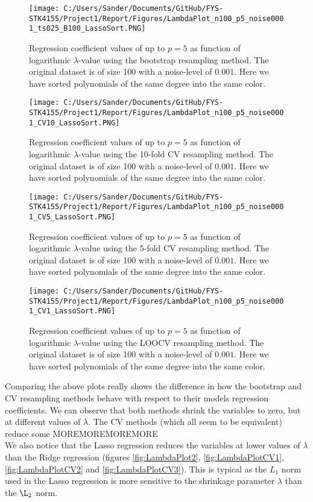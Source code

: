 \documentclass[12pt,a4paper]{article}
\begin{document}
\begin{figure}[H]
\centering
\texttt{[image: C:/Users/Sander/Documents/GitHub/FYS-STK4155/Project1/Report/Figures/LambdaPlot\_n100\_p5\_noise0001\_ts025\_B100\_LassoSort.PNG]}
\caption{\label{fig:LambdaLasso1} Regression coefficient values of up to $p = 5$ as function of logarithmic $\lambda$-value using the bootstrap resampling method. The original dataset is of size 100 with a noise-level of $0.001$. Here we have sorted polynomials of the same degree into the same color.}
\end{figure}

\begin{figure}[H]
\centering
\texttt{[image: C:/Users/Sander/Documents/GitHub/FYS-STK4155/Project1/Report/Figures/LambdaPlot\_n100\_p5\_noise0001\_CV10\_LassoSort.PNG]}
\caption{\label{fig:LambdaLasso2} Regression coefficient values of up to $p = 5$ as function of logarithmic $\lambda$-value using the 10-fold CV resampling method. The original dataset is of size 100 with a noise-level of $0.001$. Here we have sorted polynomials of the same degree into the same color.}
\end{figure}

\begin{figure}[H]
\centering
\texttt{[image: C:/Users/Sander/Documents/GitHub/FYS-STK4155/Project1/Report/Figures/LambdaPlot\_n100\_p5\_noise0001\_CV5\_LassoSort.PNG]}
\caption{\label{fig:LambdaLasso3} Regression coefficient values of up to $p = 5$ as function of logarithmic $\lambda$-value using the 5-fold CV resampling method. The original dataset is of size 100 with a noise-level of $0.001$. Here we have sorted polynomials of the same degree into the same color.}
\end{figure}

\begin{figure}[H]
\centering
\texttt{[image: C:/Users/Sander/Documents/GitHub/FYS-STK4155/Project1/Report/Figures/LambdaPlot\_n100\_p5\_noise0001\_CV1\_LassoSort.PNG]}
\caption{\label{fig:LambdaLasso4} Regression coefficient values of up to $p = 5$ as function of logarithmic $\lambda$-value using the LOOCV resampling method. The original dataset is of size 100 with a noise-level of $0.001$. Here we have sorted polynomials of the same degree into the same color.}
\end{figure}

\noindent Comparing the above plots really shows the difference in how the bootstrap and CV resampling methods behave with respect to their models regression coefficients. We can observe that both methods shrink the variables to zero, but at different values of $\lambda$. The CV methods (which all seem to be equivalent) reduce some MOREMOREMOREMORE
\\
We also notice that the Lasso regression reduces the variables at lower values of $\lambda$ than the Ridge regression (figures \ref{fig:LambdaPlot2}, \ref{fig:LambdaPlotCV1}, \ref{fig:LambdaPlotCV2} and \ref{fig:LambdaPlotCV3}). This is typical as the $L_1$ norm used in the Lasso regression is more sensitive to the shrinkage parameter $\lambda$ than the $\L_2$ norm. 
\end{document}
